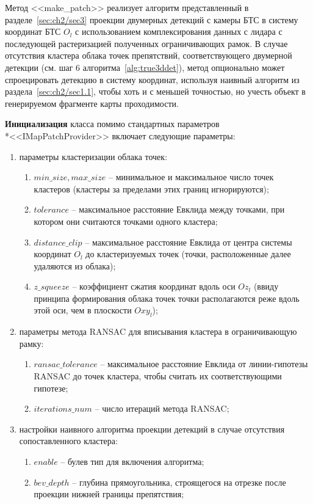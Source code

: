 Метод <<make\_patch>> реализует алгоритм представленный в разделе~\cref{sec:ch2/sec3} проекции двумерных детекций с камеры БТС в систему координат БТС $O_l$ с использованием комплексирования данных с лидара с последующей растеризацией полученных ограничивающих рамок. В случае отсутствия кластера облака точек препятствий, соответствующего двумерной детекции (см. шаг 6 алгоритма~\ref{alg:true3ddet}), метод опционально может спроецировать детекцию в систему координат, используя наивный алгоритм из раздела~\cref{sec:ch2/sec1.1}, чтобы хоть и с меньшей точностью, но учесть объект в генерируемом фрагменте карты проходимости.

\textbf{Инициализация} класса помимо стандартных параметров\\*<<IMapPatchProvider>> включает следующие параметры:

\begin{enumerate}
	\item параметры кластеризации облака точек:
	\begin{enumerate}
	\item $min\_size, max\_size$ -- минимальное и максимальное число точек кластеров (кластеры за пределами этих границ игнорируются);
	\item $tolerance$ -- максимальное расстояние Евклида между точками, при котором они считаются точками одного кластера;
	\item $distance\_clip$ -- максимальное расстояние Евклида от центра системы координат $O_l$ до кластеризуемых точек (точки, расположенные далее удаляются из облака);
	\item $z\_squeeze$ -- коэффициент сжатия координат вдоль оси $Oz_l$ (ввиду принципа формирования облака точек точки располагаются реже вдоль этой оси, чем в плоскости $Oxy_l$);
    \end{enumerate}
	\item параметры метода RANSAC для вписывания кластера в ограничивающую рамку:
	\begin{enumerate}
	\item $ransac\_tolerance$ -- максимальное расстояние Евклида от линии-гипотезы RANSAC до точек кластера, чтобы считать их соответствующими гипотезе;
	\item $iterations\_num$ -- число итераций метода RANSAC;
	\end{enumerate}
	\item настройки наивного алгоритма проекции детекций в случае отсутствия сопоставленного кластера:
	\begin{enumerate}
	\item $enable$ -- булев тип для включения алгоритма;
	\item $bev\_depth$ -- глубина прямоугольника, строящегося на отрезке после проекции нижней границы препятствия;
    \end{enumerate}
\end{enumerate}


